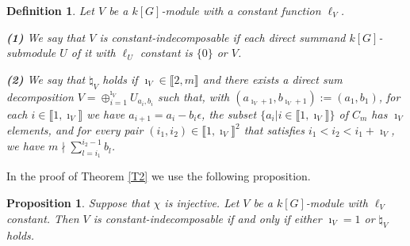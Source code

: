 \documentclass[11pt]{amsart}
\newtheorem{definition}[theorem]{Definition}
\newtheorem{proposition}[theorem]{Proposition}
\begin{document}
\begin{definition}\label{D4} 
Let $V$ be a $k[G]$-module with a constant function $\ell_V$. 

\medskip 
{\bf (1)} We say that $V$ is constant-indecomposable if each direct summand $k[G]$-submodule $U$ of it with $\ell_U$ constant is $\{0\}$ or $V$.

\smallskip
{\bf (2)} We say that $\natural_V$ holds if $\imath_V\in\llbracket2,m\rrbracket$ and there exists a direct sum decomposition $V=\oplus_{i=1}^{\imath_V} U_{a_i,b_i}$ such that, with $(a_{\imath_V+1},b_{\imath_V+1}):=(a_1,b_1)$, for each $i\in\llbracket1,\imath_V\rrbracket$ we have $a_{i+1}=a_i-b_i\epsilon$, the subset $\{a_i|i\in\llbracket1,\imath_V\rrbracket\}$ of $C_m$ has $\imath_V$ elements, and for every pair $(i_1,i_2)\in\llbracket1,\imath_V\rrbracket^2$ that satisfies $i_1<i_2<i_1+\imath_V$, we have $m\nmid \sum_{l=i_1}^{i_2-1} b_l$.
\end{definition} 

In the proof of Theorem \ref{T2} we use the following proposition.

\begin{proposition}\label{P1}
Suppose that $\chi$ is injective. Let $V$ be a $k[G]$-module with $\ell_V$ constant. Then $V$ is constant-indecomposable if and only if either $\imath_V=1$ or $\natural_V$ holds.
\end{proposition}
\end{document}
